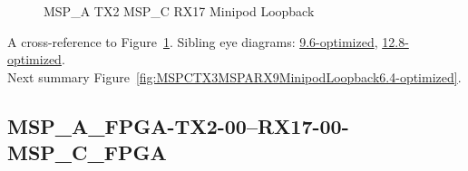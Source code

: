 \begin{figure}[h]
\begin{subfigure}{0.33\textwidth}
\hyperref[sec:MSPAFPGATX206RX1706MSPCFPGA6.4-optimized]{}
\end{subfigure}\hspace*{\fill}
\begin{subfigure}{0.33\textwidth}
\hyperref[sec:MSPAFPGATX207RX1707MSPCFPGA6.4-optimized]{}
\end{subfigure}\hspace*{\fill}
\begin{subfigure}{0.33\textwidth}
\hyperref[sec:MSPAFPGATX208RX1708MSPCFPGA6.4-optimized]{}
\end{subfigure}

\begin{subfigure}{0.33\textwidth}
\hyperref[sec:MSPAFPGATX209RX1709MSPCFPGA6.4-optimized]{}
\end{subfigure}\hspace*{\fill}
\begin{subfigure}{0.33\textwidth}
\hyperref[sec:MSPAFPGATX210RX1710MSPCFPGA6.4-optimized]{}
\end{subfigure}\hspace*{\fill}
\begin{subfigure}{0.33\textwidth}
\hyperref[sec:MSPAFPGATX211RX1711MSPCFPGA6.4-optimized]{}
\end{subfigure}

\caption{MSP\_A TX2 MSP\_C RX17 Minipod Loopback} \label{fig:MSPATX2MSPCRX17MinipodLoopback6.4-optimized}
\end{figure}

A cross-reference to Figure~\ref{fig:MSPATX2MSPCRX17MinipodLoopback6.4-optimized}.
Sibling eye diagrams: \hyperref[sec:MSPATX2MSPCRX17MinipodLoopback9.6-optimized]{9.6-optimized}, \hyperref[sec:MSPATX2MSPCRX17MinipodLoopback12.8-optimized]{12.8-optimized}. \\
Next summary Figure~\ref{fig:MSPCTX3MSPARX9MinipodLoopback6.4-optimized}.
\clearpage
% 
\subsection{MSP\_A\_FPGA-TX2-00--RX17-00-MSP\_C\_FPGA}\label{sec:MSPAFPGATX200RX1700MSPCFPGA6.4-optimized}

